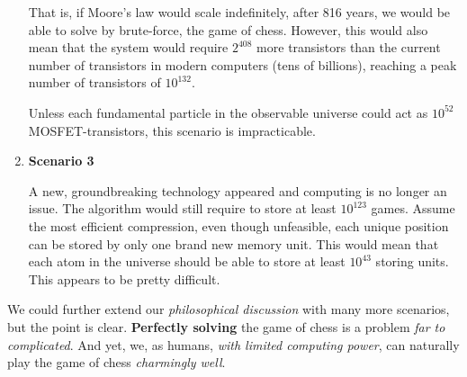 \begin{enumerate}[label=\roman*]
That is, if Moore's law would scale indefinitely, after 816 years, we would be able to solve by brute-force, the game of chess. However, this would also mean that the system would require $2^{408}$ more transistors than the current number of transistors in modern computers (tens of billions), reaching a peak number of transistors of $10^{132}$. 

Unless each fundamental particle in the observable universe could act as $10^{52}$ MOSFET-transistors, this scenario is impracticable.

  \item \textbf{Scenario 3} 
  
  A new, groundbreaking technology appeared and computing is no longer an issue. The algorithm would still require to store at least $10^{123}$ games. Assume the most efficient compression, even though unfeasible, each unique position can be stored by only one brand new memory unit. This would mean that each atom in the universe should be able to store at least $10^{43}$ storing units. This appears to be pretty difficult.
\end{enumerate}

We could further extend our \textit{philosophical discussion} with many more scenarios, but the point is clear. \textbf{Perfectly solving} the game of chess is a problem \textit{far to complicated}. And yet, we, as humans, \textit{with limited computing power}, can naturally play the game of chess \textit{charmingly well}.